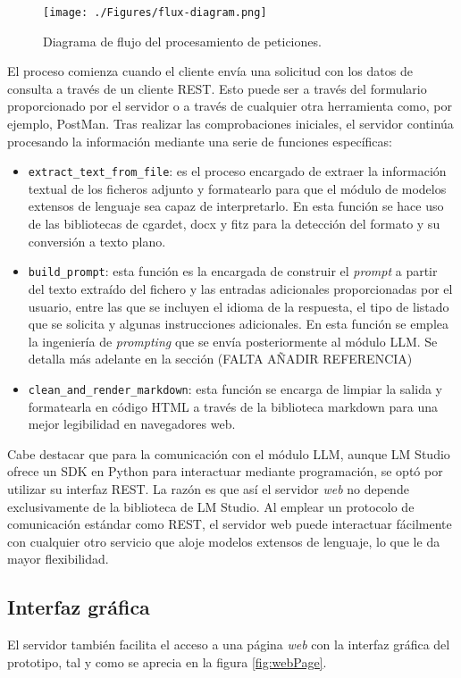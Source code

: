 \begin{figure}[htbp]
	\centering
	\texttt{[image: ./Figures/flux-diagram.png]}
	\caption{Diagrama de flujo del procesamiento de peticiones.}
	\label{fig:flux}
\end{figure}

El proceso comienza cuando el cliente envía una solicitud con los datos de consulta a través de un cliente REST.
Esto puede ser a través del formulario proporcionado por el servidor o a través de cualquier otra herramienta como,
por ejemplo, PostMan.
Tras realizar las comprobaciones iniciales,
el servidor continúa procesando la información mediante una serie de funciones específicas:
\begin{itemize}
\item \texttt{extract\_text\_from\_file}:
es el proceso encargado de extraer la información textual de los ficheros adjunto
y formatearlo para que el módulo de modelos extensos de lenguaje sea capaz de interpretarlo.
En esta función se hace uso de las bibliotecas de cgardet, docx y fitz para la detección del formato y
su conversión a texto plano.
\item \texttt{build\_prompt}:
esta función es la encargada de construir el \textit{prompt} a partir del texto extraído del fichero
y las entradas adicionales proporcionadas por el usuario, entre las que se incluyen el idioma de
la respuesta, el tipo de listado que se solicita y algunas instrucciones adicionales.
En esta función se emplea la ingeniería de \textit{prompting} que se envía posteriormente al módulo LLM.
Se detalla más adelante en la sección (FALTA AÑADIR REFERENCIA)
\item \texttt{clean\_and\_render\_markdown}:
esta función se encarga de limpiar la salida y formatearla en código HTML
a través de la biblioteca markdown para una mejor legibilidad en navegadores web.
\end{itemize}

Cabe destacar que para la comunicación con el módulo LLM,
aunque LM Studio ofrece un SDK en Python para interactuar mediante programación,
se optó por utilizar su interfaz REST.
La razón es que así el servidor \textit{web} no depende exclusivamente de la biblioteca de LM Studio.
Al emplear un protocolo de comunicación estándar como REST,
el servidor web puede interactuar fácilmente con cualquier otro servicio que aloje modelos extensos de lenguaje,
lo que le da mayor flexibilidad.

\subsection{Interfaz gráfica}
El servidor también facilita el acceso a una página \textit{web} con la interfaz gráfica del prototipo,
tal y como se aprecia en la figura \ref{fig:webPage}.

